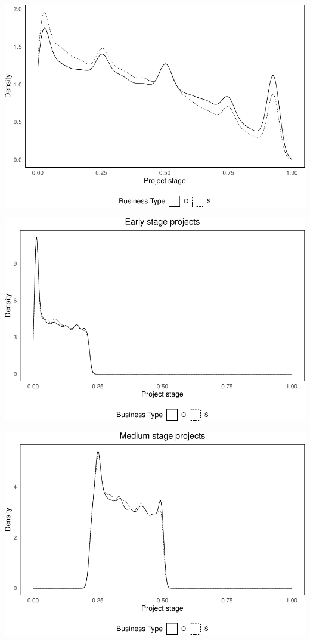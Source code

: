 \documentclass[
]{article}
\begin{document}
\includegraphics{qp_first_pc_delay-2_files/figure-latex/stage_plots_3-1.pdf}

\includegraphics{qp_first_pc_delay-2_files/figure-latex/stage_plots_tercile_1-1.pdf}

\includegraphics{qp_first_pc_delay-2_files/figure-latex/stage_plots_tercile_2-1.pdf}
\end{document}
